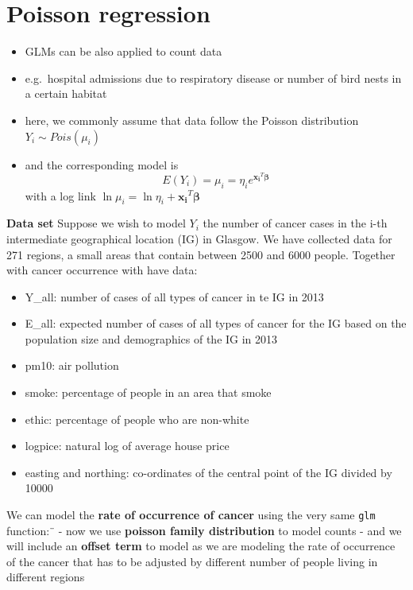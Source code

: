 \documentclass[
]{book}
\providecommand{\tightlist}{%
  \setlength{\itemsep}{0pt}\setlength{\parskip}{0pt}}
\theoremstyle{definition}
\theoremstyle{definition}
\theoremstyle{definition}
\theoremstyle{remark}
\begin{document}
\hypertarget{poisson-regression}{%
\section{Poisson regression}\label{poisson-regression}}

\begin{itemize}
\tightlist
\item
  GLMs can be also applied to count data
\item
  e.g.~hospital admissions due to respiratory disease or number of bird nests in a certain habitat
\item
  here, we commonly assume that data follow the Poisson distribution \(Y_i \sim Pois(\mu_i)\)
\item
  and the corresponding model is
  \[E(Y_i)=\mu_i = \eta_ie^{\mathbf{x_i}^T\boldsymbol\beta}\] with a log link \(\ln\mu_i = \ln \eta_i + \mathbf{x_i}^T\boldsymbol\beta\)
\end{itemize}

\textbf{Data set}
Suppose we wish to model \(Y_i\) the number of cancer cases in the i-th intermediate geographical location (IG) in Glasgow. We have collected data for 271 regions, a small areas that contain between 2500 and 6000 people. Together with cancer occurrence with have data:

\begin{itemize}
\tightlist
\item
  Y\_all: number of cases of all types of cancer in te IG in 2013
\item
  E\_all: expected number of cases of all types of cancer for the IG based on the population size and demographics of the IG in 2013
\item
  pm10: air pollution
\item
  smoke: percentage of people in an area that smoke
\item
  ethic: percentage of people who are non-white
\item
  logpice: natural log of average house price
\item
  easting and northing: co-ordinates of the central point of the IG divided by 10000
\end{itemize}

We can model the \textbf{rate of occurrence of cancer} using the very same \texttt{glm} function:¨
- now we use \textbf{poisson family distribution} to model counts
- and we will include an \textbf{offset term} to model as we are modeling the rate of occurrence of the cancer that has to be adjusted by different number of people living in different regions
\end{document}
